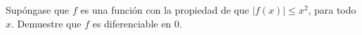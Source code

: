 \item Supóngase que $f$ es una función con la propiedad de que $|f(x)| \le x^2$, para todo $x$. Demuestre que $f$ es diferenciable en $0$.
